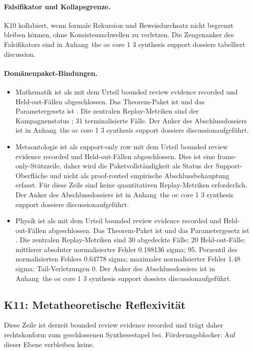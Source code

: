 \paragraph{Falsifikator und Kollapsgrenze.}
K10 kollabiert, wenn formale Rekursion und Beweisdurchsatz nicht begrenzt bleiben können, ohne Konsistenzschwellen zu verletzen.
Die Zeugenanker des Falsifikators sind in Anhang~the oc core 1 3 synthesis support dossiers tabelliert discussion.

\paragraph{Domänenpaket-Bindungen.}
\begin{itemize}[leftmargin=1.6em,nosep]
\item Mathematik ist als  mit dem Urteil bounded review evidence recorded und  Held-out-Fällen abgeschlossen. Das Theorem-Paket ist  und das Parametergesetz ist . Die zentralen Replay-Metriken sind der Kampagnenstatus ; 31 terminalisierte Fälle. Der Anker des Abschlussdossiers ist in Anhang~the oc core 1 3 synthesis support dossiers discussionaufgeführt.
\item Metaontologie ist als support-only row mit dem Urteil bounded review evidence recorded und  Held-out-Fällen abgeschlossen. Dies ist eine frame-only-Stützzeile, daher wird die Paketvollständigkeit als Status der Support-Oberfläche und nicht als proof-routed empirische Abschlussbehauptung erfasst. Für diese Zeile sind keine quantitativen Replay-Metriken erforderlich. Der Anker des Abschlussdossiers ist in Anhang~the oc core 1 3 synthesis support dossiers discussionaufgeführt.
\item Physik ist als  mit dem Urteil bounded review evidence recorded und  Held-out-Fällen abgeschlossen. Das Theorem-Paket ist  und das Parametergesetz ist . Die zentralen Replay-Metriken sind 30 abgedeckte Fälle; 20 Held-out-Fälle; mittlerer absoluter normalisierter Fehler 0.188136 sigma; 95. Perzentil des normalisierten Fehlers 0.64778 sigma; maximaler normalisierter Fehler 1.48 sigma; Tail-Verletzungen 0. Der Anker des Abschlussdossiers ist in Anhang~the oc core 1 3 synthesis support dossiers discussionaufgeführt.
\end{itemize}

\subsection{K11: Metatheoretische Reflexivität}
\label{sec:oc-core-1-3-synthesis-k11}
Diese Zeile ist derzeit bounded review evidence recorded und trägt daher rechtskonform zum geschlossenen Synthesestapel bei.
Förderungsblocker: Auf dieser Ebene verbleiben keine.

